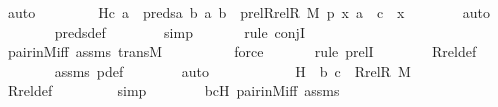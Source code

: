 \begin{isabellebody}
\ auto\ \isanewline
\ \ \ \ \isamarkupfalse%
\ \isamarkupfalse%
\ H{}{\isacharcolon}{\kern0pt}{\isachardoublequoteopen}{\isasymlangle}c{\isacharcomma}{\kern0pt}\ a{\isasymrangle}\ {\isasymin}\ preds{\isacharparenleft}{\kern0pt}{\isasymlambda}a\ b{\isachardot}{\kern0pt}\ {\isasymlangle}a{\isacharcomma}{\kern0pt}\ b{\isasymrangle}\ {\isasymin}\ prel{\isacharparenleft}{\kern0pt}Rrel{\isacharparenleft}{\kern0pt}R{\isacharcomma}{\kern0pt}\ M{\isacharparenright}{\kern0pt}{\isacharcomma}{\kern0pt}\ p{\isacharparenright}{\kern0pt}{\isacharcomma}{\kern0pt}\ {\isasymlangle}x{\isacharcomma}{\kern0pt}\ a{\isasymrangle}{\isacharparenright}{\kern0pt}\ {\isasymor}\ c\ {\isacharequal}{\kern0pt}\ x{\isachardoublequoteclose}\isanewline
\ \ \ \ \ \ \isamarkupfalse%
\ auto{\isacharbrackleft}{\kern0pt}{}{\isacharbrackright}{\kern0pt}\isanewline
\ \ \ \ \ \ \isamarkupfalse%
\ preds{\isacharunderscore}{\kern0pt}def\isanewline
\ \ \ \ \ \ \isamarkupfalse%
\ simp\isanewline
\ \ \ \ \ \ \isamarkupfalse%
{\isacharparenleft}{\kern0pt}rule\ conjI{\isacharparenright}{\kern0pt}\isanewline
\ \ \ \ \ \ \isamarkupfalse%
\ pair{\isacharunderscore}{\kern0pt}in{\isacharunderscore}{\kern0pt}M{\isacharunderscore}{\kern0pt}iff\ assms\ transM\ \isanewline
\ \ \ \ \ \ \ \isamarkupfalse%
\ force\isanewline
\ \ \ \ \ \ \isamarkupfalse%
{\isacharparenleft}{\kern0pt}rule\ prelI{\isacharparenright}{\kern0pt}\isanewline
\ \ \ \ \ \ \isamarkupfalse%
\ Rrel{\isacharunderscore}{\kern0pt}def\ \isanewline
\ \ \ \ \ \ \isamarkupfalse%
\ assms\ p{\isacharunderscore}{\kern0pt}def\isanewline
\ \ \ \ \ \ \isamarkupfalse%
\ auto\ \ \ \ \ \ \isanewline
\isanewline
\ \ \ \ \isamarkupfalse%
\ H{}\ {\isacharcolon}{\kern0pt}\ {\isachardoublequoteopen}{\isacharless}{\kern0pt}b{\isacharcomma}{\kern0pt}\ c{\isachargreater}{\kern0pt}\ {\isasymin}\ Rrel{\isacharparenleft}{\kern0pt}R{\isacharcomma}{\kern0pt}\ M{\isacharparenright}{\kern0pt}{\isachardoublequoteclose}\ \isanewline
\ \ \ \ \ \ \isamarkupfalse%
\ Rrel{\isacharunderscore}{\kern0pt}def\ \isanewline
\ \ \ \ \ \ \isamarkupfalse%
\ simp\isanewline
\ \ \ \ \ \ \isamarkupfalse%
\ bcH\ pair{\isacharunderscore}{\kern0pt}in{\isacharunderscore}{\kern0pt}M{\isacharunderscore}{\kern0pt}iff\ assms\isanewline
\ \ \ \ \ \ \isamarkupfalse%

\end{isabellebody}

